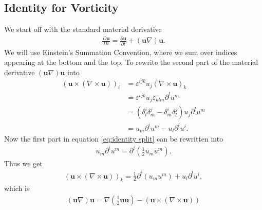 \subsection{Identity for Vorticity}
\label{appendix:diff identity}
We start off with the standard material derivative
\begin{align}
    \frac{D\mathbf{u}}{Dt} = \frac{\partial \mathbf{u}}{\partial t}
    +(\mathbf{u}\nabla)\mathbf{u}.
\end{align}
We will use Einstein's Summation Convention, where we sum over indices
appearing at the bottom and the top. To rewrite the second part of the
material derivative $(\mathbf{u}\nabla)\mathbf{u}$ into
\begin{align}
    (\mathbf{u}\times (\nabla \times \mathbf{u}))_i
    &= \varepsilon^{ijk}u_j(\nabla \times  \mathbf{u})_k \\
    &= \varepsilon^{ijk}u_j\varepsilon_{klm}\partial^l u^m\\
    &=(\delta^i_l\delta^j_m-\delta^i_m\delta^j_l)u_j\partial^l u^m\\
    &=u_m\partial^i u^m - u_l \partial^l u^i.\label{eq:identity split}
\end{align}
Now the first part in equation \ref{eq:identity split} can be rewritten into
\begin{align}
    u_m\partial^i u^m =\partial^i (\frac{1}{2}u_mu^m) .
\end{align}
Thus we get
\begin{align}
    (\mathbf{u}\times (\nabla \times \mathbf{u}))_k
    = \frac{1}{2}\partial^i(u_m u^m) + u_l \partial^l u^i,
\end{align}
which is
\begin{align}
    (\mathbf{u}\nabla)\mathbf{u} = \nabla(\frac{1}{2}\mathbf{u}\mathbf{u}) -
    \left(\mathbf{u}\times (\nabla \times  \mathbf{u})\right)
\end{align}

